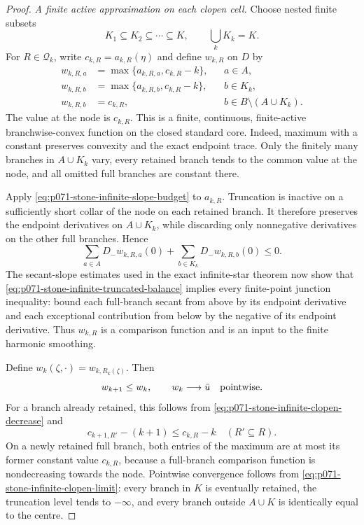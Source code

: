 \begin{proof}
\medskip\noindent
\emph{A finite active approximation on each clopen cell.}
Choose nested finite subsets
\[
                   K_1\subseteq K_2\subseteq\cdots\subseteq K,
                   \qquad \bigcup_kK_k=K.
\]
For \(R\in\mathscr Q_k\), write \(c_{k,R}=a_{k,R}(\eta)\) and define
\(w_{k,R}\) on \(D\) by
\begin{align}
 w_{k,R,a}
    &=\max\{a_{k,R,a},c_{k,R}-k\},
       &&a\in A,                                      \label{eq:p071-stone-infinite-truncate-a}\\
 w_{k,R,b}
    &=\max\{a_{k,R,b},c_{k,R}-k\},
       &&b\in K_k,                                    \label{eq:p071-stone-infinite-truncate-k}\\
 w_{k,R,b}
    &=c_{k,R},
       &&b\in B\setminus(A\cup K_k).                  \label{eq:p071-stone-infinite-truncate-rest}
\end{align}
The value at the node is \(c_{k,R}\).  This is a finite, continuous,
finite-active branchwise-convex function on the closed standard core.
Indeed, maximum with a constant preserves convexity and the exact
endpoint trace.  Only the finitely many branches in \(A\cup K_k\) vary,
every retained branch tends to the common value at the node, and all
omitted full branches are constant there.

Apply \eqref{eq:p071-stone-infinite-slope-budget} to \(a_{k,R}\).
Truncation is inactive on a sufficiently short collar of the node on
each retained branch.  It therefore preserves the endpoint derivatives
on \(A\cup K_k\), while discarding only nonnegative derivatives on the
other full branches.  Hence
\begin{equation}
             \sum_{a\in A}D_-w_{k,R,a}(0)
               +\sum_{b\in K_k}D_-w_{k,R,b}(0)\leq0.
 \label{eq:p071-stone-infinite-truncated-balance}
\end{equation}
The secant-slope estimates used in the exact infinite-star theorem now
show that \eqref{eq:p071-stone-infinite-truncated-balance} implies every
finite-point junction inequality: bound each full-branch secant from
above by its endpoint derivative and each exceptional contribution from
below by the negative of its endpoint derivative.  Thus \(w_{k,R}\) is
a comparison function and is an input to the finite harmonic smoothing.

Define \(w_k(\zeta,\cdot)=w_{k,R_k(\zeta)}\).  Then
\begin{equation}
                         w_{k+1}\leq w_k,
                  \qquad w_k\longrightarrow\bar u
                         \quad\hbox{pointwise}.
 \label{eq:p071-stone-infinite-truncated-limit}
\end{equation}
For a branch already retained, this follows from
\eqref{eq:p071-stone-infinite-clopen-decrease} and
\[
 c_{k+1,R'}-(k+1)\leq c_{k,R}-k
 \quad(R'\subseteq R).
\]
On a newly retained full branch, both entries of the maximum are at most
its former constant value \(c_{k,R}\), because a full-branch comparison
function is nondecreasing towards the node.  Pointwise convergence
follows from \eqref{eq:p071-stone-infinite-clopen-limit}: every branch
in \(K\) is eventually retained, the truncation level tends to
\(-\infty\), and every branch outside \(A\cup K\) is identically equal
to the centre.


\end{proof}
